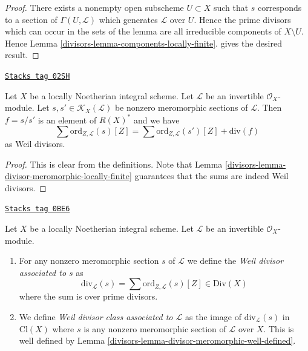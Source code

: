 \begin{proof}

There exists a nonempty open subscheme $U \subset X$ such that $s$
corresponds to a section of $\Gamma(U, \mathcal{L})$ which generates
$\mathcal{L}$ over $U$. Hence the prime divisors which can occur
in the sets of the lemma are all irreducible components of $X \setminus U$.
Hence Lemma \ref{divisors-lemma-components-locally-finite}.
gives the desired result.
\end{proof}

\begin{lemma}
\label{divisors-lemma-divisor-meromorphic-well-defined}
\href{https://stacks.math.columbia.edu/tag/02SH}{\texttt{Stacks tag 02SH}}

Let $X$ be a locally Noetherian integral scheme.
Let $\mathcal{L}$ be an invertible $\mathcal{O}_X$-module.
Let $s, s' \in \mathcal{K}_X(\mathcal{L})$ be nonzero
meromorphic sections of $\mathcal{L}$. Then $f = s/s'$
is an element of $R(X)^*$ and we have
$$
\sum \text{ord}_{Z, \mathcal{L}}(s)[Z]
=
\sum \text{ord}_{Z, \mathcal{L}}(s')[Z]
+
\text{div}(f)
$$
as Weil divisors.
\end{lemma}

\begin{proof}

This is clear from the definitions.
Note that Lemma \ref{divisors-lemma-divisor-meromorphic-locally-finite}
guarantees that the sums are indeed Weil divisors.
\end{proof}

\begin{definition}
\label{divisors-definition-divisor-invertible-sheaf}
\href{https://stacks.math.columbia.edu/tag/0BE6}{\texttt{Stacks tag 0BE6}}

Let $X$ be a locally Noetherian integral scheme.
Let $\mathcal{L}$ be an invertible $\mathcal{O}_X$-module.
\begin{enumerate}
\item For any nonzero meromorphic section $s$ of $\mathcal{L}$
we define the {\it Weil divisor associated to $s$} as
$$
\text{div}_\mathcal{L}(s) =
\sum \text{ord}_{Z, \mathcal{L}}(s) [Z] \in \text{Div}(X)
$$
where the sum is over prime divisors.
\item We define {\it Weil divisor class associated to $\mathcal{L}$}
as the image of $\text{div}_\mathcal{L}(s)$ in $\text{Cl}(X)$
where $s$ is any nonzero meromorphic section of $\mathcal{L}$ over
$X$. This is well defined by
Lemma \ref{divisors-lemma-divisor-meromorphic-well-defined}.
\end{enumerate}
\end{definition}

